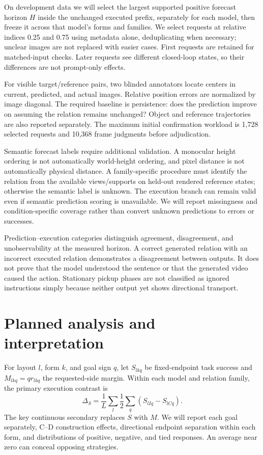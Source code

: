\documentclass[11pt]{article}
\begin{document}
On development data we will select the largest supported positive forecast horizon $H$ inside the unchanged executed prefix, separately for each model, then freeze it across that model's forms and families. We select requests at relative indices 0.25 and 0.75 using metadata alone, deduplicating when necessary; unclear images are not replaced with easier cases. First requests are retained for matched-input checks. Later requests see different closed-loop states, so their differences are not prompt-only effects.

For visible target/reference pairs, two blinded annotators locate centers in current, predicted, and actual images. Relative position errors are normalized by image diagonal. The required baseline is persistence: does the prediction improve on assuming the relation remains unchanged? Object and reference trajectories are also reported separately. The maximum initial confirmation workload is 1,728 selected requests and 10,368 frame judgments before adjudication.

Semantic forecast labels require additional validation. A monocular height ordering is not automatically world-height ordering, and pixel distance is not automatically physical distance. A family-specific procedure must identify the relation from the available views/supports on held-out rendered reference states; otherwise the semantic label is unknown. The execution branch can remain valid even if semantic prediction scoring is unavailable. We will report missingness and condition-specific coverage rather than convert unknown predictions to errors or successes.

Prediction--execution categories distinguish agreement, disagreement, and unobservability at the measured horizon. A correct generated relation with an incorrect executed relation demonstrates a disagreement between outputs. It does not prove that the model understood the sentence or that the generated video caused the action. Stationary pickup phases are not classified as ignored instructions simply because neither output yet shows directional transport.

\section{Planned analysis and interpretation}
For layout $l$, form $k$, and goal sign $q$, let $S_{lkq}$ be fixed-endpoint task success and $M_{lkq}=q r_{lkq}$ the requested-side margin. Within each model and relation family, the primary execution contrast is
\begin{equation}
\Delta_S = \frac{1}{L}\sum_l\frac{1}{2}\sum_q(S_{lIq}-S_{lCq}).
\end{equation}
The key continuous secondary replaces $S$ with $M$. We will report each goal separately, C--D construction effects, directional endpoint separation within each form, and distributions of positive, negative, and tied responses. An average near zero can conceal opposing strategies.
\end{document}
